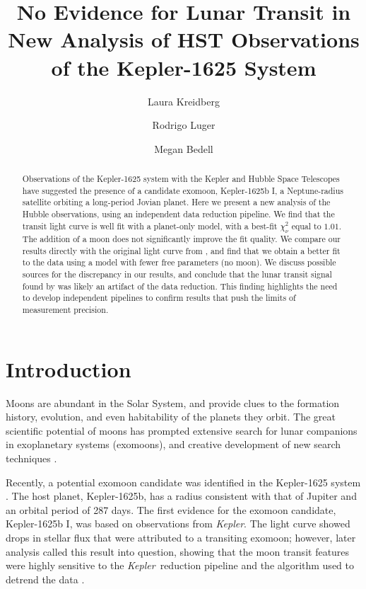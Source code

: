 \documentclass[twocolumn,trackchanges]{aastex62}
\newcommand{\project}[1]{\textsl{#1}}
\newcommand{\Kepler}{\project{Kepler}}
\begin{document}
\title{No Evidence for Lunar Transit in New Analysis of HST Observations of the Kepler-1625 System}

\author{Laura Kreidberg}
\author{Rodrigo Luger}
\author{Megan Bedell}

\begin{abstract}
    Observations of the Kepler-1625 system with the Kepler and Hubble Space Telescopes have suggested the presence of a candidate exomoon, Kepler-1625b I, a Neptune-radius satellite orbiting a long-period Jovian planet. Here we present a new analysis of the Hubble observations, using an independent data reduction pipeline. We find that the transit light curve is well fit with a planet-only model, with a best-fit $\chi^2_\nu$ equal to $1.01$. The addition of a moon does not significantly improve the fit quality. We compare our results directly with the original light curve from \cite{teachey18b}, and find that we obtain a better fit to the data using a model with fewer free parameters (no moon).  We discuss possible sources for the discrepancy in our results, and conclude that the lunar transit signal found by \cite{teachey18b} was likely an artifact of the data reduction.  This finding highlights the need to develop independent pipelines to confirm results that push the limits of measurement precision.
\end{abstract}


\section{Introduction} \label{sec:intro}
Moons are abundant in the Solar System, and provide clues to the formation history, evolution, and even habitability of the planets they orbit. The great scientific potential of moons has prompted extensive search for lunar companions in exoplanetary systems (exomoons), and creative development of new search techniques \citep[e.g.][]{kipping09a, kipping09b, kipping13, simon10, peters13, heller14, noyola14, hippke15, agol15, sengupta16,  vanderburg18}. 

Recently, a potential exomoon candidate was identified in the Kepler-1625 system \citep{teachey18a}. The host planet, Kepler-1625b, has a radius consistent with that of Jupiter and an orbital period of 287 days.  The first evidence for the exomoon candidate, Kepler-1625b I, was based on observations from \Kepler. The light curve showed drops in stellar flux that were attributed to a transiting exomoon; however, later analysis called this result into question, showing that the moon transit features were highly sensitive to the \Kepler\ reduction pipeline and the algorithm used to detrend the data \citep{teachey18b, rodenbeck18}. 
\end{document}
